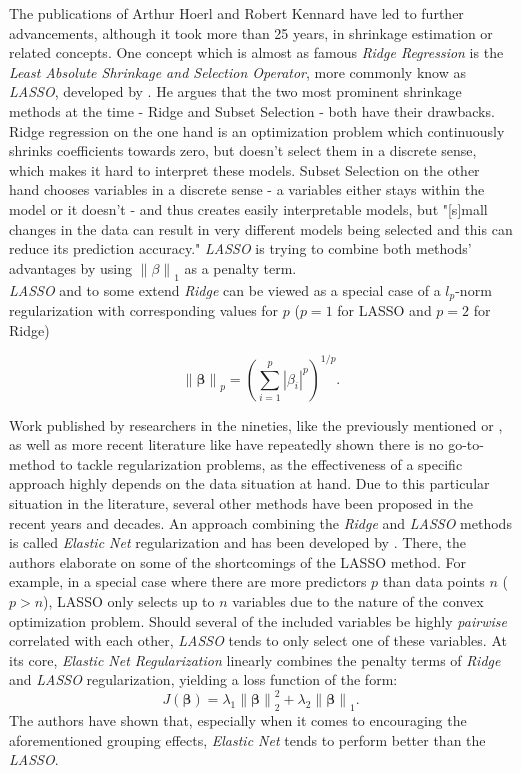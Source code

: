 \documentclass[12pt,a4paper]{article}
\newcommand{\norm}[1]{\left\lVert#1\right\rVert}
\begin{document}
The publications of Arthur Hoerl and Robert Kennard have led to further advancements, although it took more than 25 years, in shrinkage estimation or related concepts. One concept which is almost as famous \textit{Ridge Regression} is the \textit{Least Absolute Shrinkage and Selection Operator}, more commonly know as \textit{LASSO}, developed by \textcite{Tibishirani1996}. He argues that the two most prominent shrinkage methods at the time - Ridge and Subset Selection - both have their drawbacks. Ridge regression on the one hand is an optimization problem which continuously shrinks coefficients towards zero, but doesn't select them in a discrete sense, which makes it hard to interpret these models. Subset Selection on the other hand chooses variables in a discrete sense - a variables either stays within the model or it doesn't - and thus creates easily interpretable models, but "[s]mall changes in the data can result in very different models being selected and this can reduce its prediction accuracy." \parencite{Tibishirani1996} \textit{LASSO} is trying to combine both methods' advantages by using $\norm{\beta}_1$ as a penalty term.\\

\textit{LASSO} and to some extend \textit{Ridge} can be viewed as a special case of a $l_p$-norm regularization with corresponding values for $p$ ($p = 1$ for LASSO and $p=2$ for Ridge) \parencite{FrankFriedman1993} 

$$\norm{\mathbf{\beta}}_p =  \left(\sum_{i=1}^p|\beta_i|^p\right)^{1/p}.$$

Work published by researchers in the nineties, like the previously mentioned \textcite{FrankFriedman1993} or \textcite{Fu1998}, as well as more recent literature like \textcite{WangEtAl2020} have repeatedly shown there is no go-to-method to tackle regularization problems, as the effectiveness of a specific approach highly depends on the data situation at hand. Due to this particular situation in the literature, several other methods have been proposed in the recent years and decades. An approach combining the \textit{Ridge} and \textit{LASSO} methods is called \textit{Elastic Net} regularization and has been developed by \textcite{ZouHastie2005}. There, the authors elaborate on some of the shortcomings of the LASSO method. For example, in a special case where there are more predictors $p$ than data points $n$ ($p > n$), LASSO only selects up to $n$ variables due to the nature of the convex optimization problem. Should several of the included variables be highly \textit{pairwise} correlated with each other, \textit{LASSO} tends to only select one of these variables. At its core, \textit{Elastic Net Regularization} linearly combines the penalty terms of \textit{Ridge} and \textit{LASSO} regularization, yielding a loss function of the form:\\
$$J(\mathbf{\beta}) = \lambda_1 \norm{\mathbf{\beta}}_2^2 + \lambda_2 \norm{\mathbf{\beta}}_1.$$
The authors have	 shown that, especially when it comes to encouraging the aforementioned grouping effects, \textit{Elastic Net} tends to perform better than the \textit{LASSO}.\\
\end{document}
